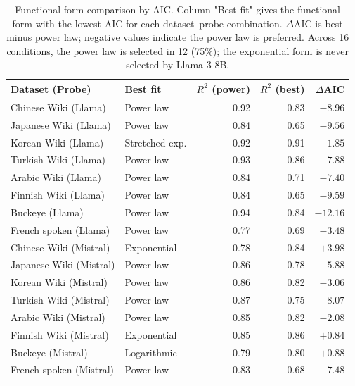 \documentclass[9pt,twoside,lineno]{pnas-new}
\begin{document}
\begin{table}[h]
\centering
\caption{Functional-form comparison by AIC. Column "Best fit" gives the functional form with the lowest AIC for each dataset--probe combination. $\Delta$AIC is best minus power law; negative values indicate the power law is preferred. Across 16 conditions, the power law is selected in 12 (75\%); the exponential form is never selected by Llama-3-8B.}
\label{tab:functional-form}
\begin{tabular}{llrrr}
\toprule
Dataset (Probe) & Best fit & $R^2$ (power) & $R^2$ (best) & $\Delta$AIC \\
\midrule
Chinese Wiki (Llama)    & Power law       & 0.92 & 0.83 & $-8.96$  \\
Japanese Wiki (Llama)   & Power law       & 0.84 & 0.65 & $-9.56$  \\
Korean Wiki (Llama)     & Stretched exp.  & 0.92 & 0.91 & $-1.85$  \\
Turkish Wiki (Llama)    & Power law       & 0.93 & 0.86 & $-7.88$  \\
Arabic Wiki (Llama)     & Power law       & 0.84 & 0.71 & $-7.40$  \\
Finnish Wiki (Llama)    & Power law       & 0.84 & 0.65 & $-9.59$  \\
Buckeye (Llama)         & Power law       & 0.94 & 0.84 & $-12.16$ \\
French spoken (Llama)   & Power law       & 0.77 & 0.69 & $-3.48$  \\
Chinese Wiki (Mistral)  & Exponential     & 0.78 & 0.84 & $+3.98$  \\
Japanese Wiki (Mistral) & Power law       & 0.86 & 0.78 & $-5.88$  \\
Korean Wiki (Mistral)   & Power law       & 0.86 & 0.82 & $-3.06$  \\
Turkish Wiki (Mistral)  & Power law       & 0.87 & 0.75 & $-8.07$  \\
Arabic Wiki (Mistral)   & Power law       & 0.85 & 0.82 & $-2.08$  \\
Finnish Wiki (Mistral)  & Exponential     & 0.85 & 0.86 & $+0.84$  \\
Buckeye (Mistral)       & Logarithmic     & 0.79 & 0.80 & $+0.88$  \\
French spoken (Mistral) & Power law       & 0.83 & 0.68 & $-7.48$  \\
\bottomrule
\end{tabular}
\end{table}

\end{document}
